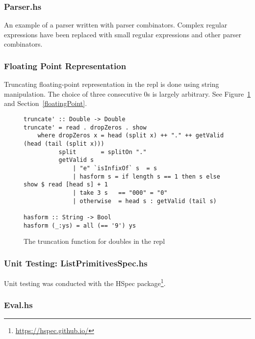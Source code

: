 \subsubsection{Parser.hs}
An example of a parser written with parser combinators. Complex regular expressions have been replaced with small
regular expressions and other parser combinators.


\subsubsection{Floating Point Representation}
Truncating floating-point representation in the repl is done using string manipulation. The choice
of three consecutive 0s is largely arbitrary. See Figure~\ref{fig:trunc} and
Section~\ref{floatingPoint}.
\begin{figure}
    \begin{verbatim}
truncate' :: Double -> Double
truncate' = read . dropZeros . show
    where dropZeros x = head (split x) ++ "." ++ getValid (head (tail (split x)))
          split       = splitOn "."
          getValid s 
              | "e" `isInfixOf` s  = s
              | hasform s = if length s == 1 then s else  show $ read [head s] + 1
              | take 3 s   == "000" = "0"
              | otherwise  = head s : getValid (tail s) 

hasform :: String -> Bool
hasform (_:ys) = all (== '9') ys 
    \end{verbatim}
    \caption{The truncation function for doubles in the repl}
\label{fig:trunc}
\end{figure}

\subsubsection{Unit Testing\@: ListPrimitivesSpec.hs}
Unit testing was conducted with the HSpec package\footnote{\url{https://hspec.github.io/}}.


\subsubsection{Eval.hs}



